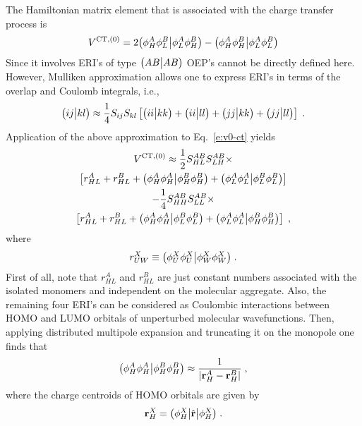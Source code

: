 The Hamiltonian matrix element that is associated with the charge transfer process
is
%
\begin{equation}\label{e:v0-ct}
 V^{{\rm CT },(0)} = 
     2 \bigl( {\phi_H^A \phi_L^B} \bigl\lvert {\phi_L^A \phi_H^B} \bigr)
      -\bigl( {\phi_H^A \phi_H^B} \bigl\lvert {\phi_L^A \phi_L^B} \bigr)
\end{equation}
%
Since it involves ERI's of type $\bigl( {AB} \bigl\lvert {AB} \bigr)$ OEP's cannot be directly defined here.
However, Mulliken approximation allows one to express ERI's in terms of the
overlap and Coulomb integrals, i.e.,
%
\begin{equation}
 \bigl( {ij} \bigl\lvert {kl} \bigr) \approx \frac{1}{4} S_{ij}S_{kl}
 \left[ \bigl( {ii} \bigl\lvert {kk} \bigr) + \bigl( {ii} \bigl\lvert {ll} \bigr) + \bigl( {jj} \bigl\lvert {kk} \bigr) + \bigl( {jj} \bigl\lvert {ll} \bigr)\right] \;.
\end{equation}
%
Application of the above approximation to Eq.~\eqref{e:v0-ct} yields
%
\begin{multline}\label{e:v0-ct.mulliken}
 V^{{\rm CT },(0)} \approx \frac{1}{2} S_{HL}^{AB} S_{LH}^{AB} \times \\
  \left[ r_{HL}^A + r_{HL}^B + \bigl( {\phi_H^A \phi_H^A} \bigl\lvert {\phi_H^B \phi_H^B} \bigr) 
                             + \bigl( {\phi_L^A \phi_L^A} \bigl\lvert {\phi_L^B \phi_L^B} \bigr)\right] \\
 -\frac{1}{4} S_{HH}^{AB} S_{LL}^{AB} \times \\
  \left[ r_{HL}^A + r_{HL}^B + \bigl( {\phi_H^A \phi_H^A} \bigl\lvert {\phi_L^B \phi_L^B} \bigr) 
                             + \bigl( {\phi_L^A \phi_L^A} \bigl\lvert {\phi_H^B \phi_H^B} \bigr)\right]  \;,
\end{multline}
%
where 
%
\begin{equation} 
 r_{UW}^X \equiv \bigl( {\phi_U^X \phi_U^X} \bigl\lvert {\phi_W^X \phi_W^X} \bigr) \;.
\end{equation}
%
First of all, note that $r_{HL}^A$ and $r_{HL}^B$ are just constant numbers
associated with the isolated monomers and 
independent on the molecular aggregate. Also, the remaining four ERI's
can be considered as Coulombic interactions between HOMO and LUMO orbitals
of unperturbed molecular wavefunctions.
Then, applying distributed multipole expansion and truncating it on the monopole
one finds that
%
\begin{equation} 
 \bigl( {\phi_H^A \phi_H^A} \bigl\lvert {\phi_H^B \phi_H^B} \bigr) \approx \frac{1}{\vert {\bf r}_H^A - {\bf r}_H^B \vert} \;,
\end{equation}
%
where the charge centroids of HOMO orbitals are given by
%
\begin{equation} 
 {\bf r}_H^X = \bigl( {\phi_H^X} \bigl\lvert {\hat{\bf r}} \bigl\lvert {\phi_H^X} \bigr) \;.
\end{equation}
